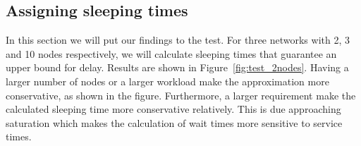 \subsection{Assigning sleeping times}
In this section we will put our findings to the test. For three networks with 2, 3 and 10 nodes respectively, we will calculate sleeping times that guarantee an upper bound for delay. Results are shown in Figure~\ref{fig:test_2nodes}. Having a larger number of nodes or a larger workload make the approximation more conservative, as shown in the figure. Furthermore, a larger requirement make the calculated sleeping time more conservative relatively. This is due approaching saturation which makes the calculation of wait times more sensitive to service times.



